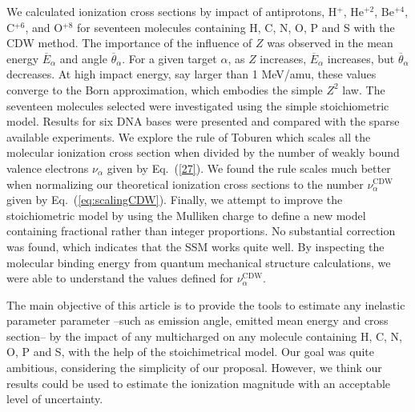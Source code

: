 \documentclass[preprint,12pt]{article}
\begin{document}
We calculated ionization cross sections by impact of antiprotons, 
H$^{+}$, He$^{+2}$, Be$^{+4}$, C$^{+6}$, and O$^{+8}$ for seventeen 
molecules containing H, C, N, O, P and S with the CDW method. The 
importance of the influence of $Z$ was observed in the mean energy 
$\overline{E}_{\alpha}$ and angle $\overline{\theta}_{\alpha}$. 
For a given target $\alpha$, as $Z$ increases, $\overline{E}_{\alpha}$ 
increases, but $\overline{\theta}_{\alpha}$ decreases. At high impact 
energy, say larger than 1 MeV/amu, these values converge to the Born 
approximation, which embodies the simple $Z^{2}$ law. The seventeen 
molecules selected were investigated using the simple stoichiometric 
model. Results for six DNA bases were presented and compared with the 
sparse available experiments. We explore the rule of Toburen which scales 
all the molecular ionization cross section when divided by the number of 
weakly bound valence electrons $\nu_{\alpha}$ given by Eq.~(\ref{27}). 
We found the rule scales much better when normalizing our theoretical 
ionization cross sections to the number $\nu_{\alpha}^{\text{CDW}}$ 
given by Eq.~(\ref{eq:scalingCDW}). Finally, we attempt to improve the 
stoichiometric model by using the Mulliken charge to define a new model 
containing fractional rather than integer proportions. No substantial 
correction was found, which indicates that the SSM works quite well.
By inspecting the molecular binding energy from quantum mechanical 
structure calculations, we were able to understand the values defined
for $\nu_{\alpha}^{\text{CDW}}$.

The main objective of this article is to provide the tools to estimate 
any inelastic parameter parameter --such as emission angle, emitted mean 
energy and cross section-- by the impact of any multicharged on any 
molecule containing H, C, N, O, P and S, with the help of the 
stoichimetrical model. Our goal was quite ambitious, considering the 
simplicity of our proposal. However, we think our results could be used 
to estimate the ionization magnitude with an acceptable level of 
uncertainty.

\bigskip
\end{document}
